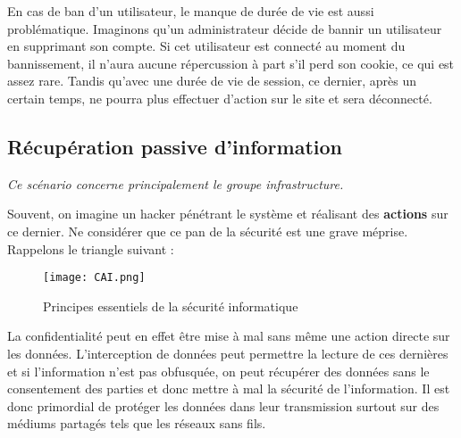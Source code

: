 En cas de ban d'un utilisateur, le manque de durée de vie est aussi problématique. Imaginons qu'un administrateur décide de bannir un utilisateur en supprimant son compte. Si cet utilisateur est connecté au moment du bannissement, il n'aura aucune répercussion à part s'il perd son cookie, ce qui est assez rare. Tandis qu'avec une durée de vie de session, ce dernier, après un certain temps, ne pourra plus effectuer d'action sur le site et sera déconnecté.


\subsection{Récupération passive d'information}

\emph{Ce scénario concerne principalement le groupe infrastructure.}
\medskip

Souvent, on imagine un hacker pénétrant le système et réalisant des \textbf{actions} sur ce dernier. Ne considérer que ce pan de la sécurité est une grave méprise. Rappelons le triangle suivant :

\begin{figure}[h]
\begin{center}
\texttt{[image: CAI.png]}
\label{cia}
\caption{Principes essentiels de la sécurité informatique}
\end{center}
\end{figure}

La confidentialité peut en effet être mise à mal sans même une action directe sur les données. L'interception de données peut permettre la lecture de ces dernières et si l'information n'est pas obfusquée, on peut récupérer des données sans le consentement des parties et donc mettre à mal la sécurité de l'information. Il est donc primordial de protéger les données dans leur transmission surtout sur des médiums partagés tels que les réseaux sans fils.
\medskip

